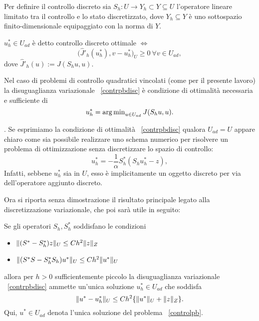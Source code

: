 Per definire il controllo discreto sia $ S_h:U\to Y_h\subset Y\subseteq U$ l'operatore lineare limitato tra il controllo e lo stato discretizzato, dove $ Y_h\subseteq Y $ è uno sottospazio finito-dimensionale equipaggiato con la norma di $ Y $.
\begin{definizione}

$ u^*_h\in U_{ad} $ è detto controllo discreto ottimale $ \iff $
\begin{equation}
\label{contrpbdisc}
\big( \hat{J}'_h(u^*_h),v-u^*_h\big)_U \ge 0 \ \forall v\in U_{ad},
\end{equation}
dove $ \hat{J}'_h(u):=J(S_h u,u) $.
\end{definizione}
\begin{osservazione}

Nel caso di problemi di controllo quadratici vincolati (come per il presente lavoro) la disuguaglianza variazionale ~\eqref{contrpbdisc} è condizione di ottimalità necessaria e sufficiente di 
\begin{equation}
u^{*}_{h}= \operatorname{arg\,min}_{u \in U_{ad}} J(S_hu,u).
\end{equation}

\end{osservazione}.
Se esprimiamo la condizione di ottimalità ~\eqref{contrpbdisc} qualora $ U_{ad}=U $ appare chiaro come sia possibile realizzare uno schema numerico per risolvere un problema di ottimizzazione senza discretizzare lo spazio di controllo:
\begin{equation}
u^*_h=-\frac{1}{\alpha}S^*_h(S_hu^*_h-z),
\end{equation}
Infatti, sebbene $ u^*_h $ sia in $ U $, esso è implicitamente un oggetto discreto per via dell'operatore aggiunto discreto.

Ora si riporta senza dimostrazione il risultato principale legato alla discretizzazione variazionale, che poi sarà utile in seguito: 
\begin{teorema}
\label{teo:Hin}

Se gli operatori $ S_h, S^*_h $ soddisfano le condizioni
\begin{itemize}

\item $ \lVert(S^*-S^*_h)z\rVert_U\le Ch^2\lVert z\rVert_Z $
\item $ \lVert(S^*S-S^*_hS_h)u^*\rVert_U\le Ch^2\lVert u^*\rVert_U $

\end{itemize}
allora per $ h>0 $ sufficientemente piccolo la disuguaglianza variazionale ~\eqref{contrpbdisc} ammette un'unica soluzione $ u^*_h\in U_{ad} $ che soddisfa 
\begin{equation}
\lVert u^*-u^*_h\rVert_U\le Ch^2\{ \lVert u^*\rVert_U + \lVert z\rVert_Z\}.
\label{controlteo}
\end{equation}
Qui, $ u^*\in U_{ad} $ denota l'unica soluzione del problema ~\eqref{controlpb}.

\end{teorema}

